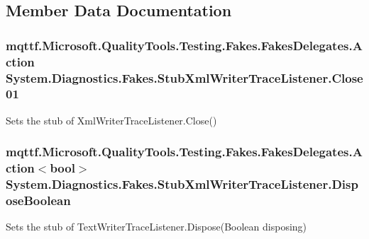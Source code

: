 \subsection{Member Data Documentation}
\hypertarget{class_system_1_1_diagnostics_1_1_fakes_1_1_stub_xml_writer_trace_listener_a513d9d1bfa7b2157c0c9e3e80cacd2f7}{
\subsubsection[{Close01}]{\setlength{\rightskip}{0pt plus 5cm}mqttf.\-Microsoft.\-Quality\-Tools.\-Testing.\-Fakes.\-Fakes\-Delegates.\-Action System.\-Diagnostics.\-Fakes.\-Stub\-Xml\-Writer\-Trace\-Listener.\-Close01}}\label{class_system_1_1_diagnostics_1_1_fakes_1_1_stub_xml_writer_trace_listener_a513d9d1bfa7b2157c0c9e3e80cacd2f7}


Sets the stub of Xml\-Writer\-Trace\-Listener.\-Close()

\hypertarget{class_system_1_1_diagnostics_1_1_fakes_1_1_stub_xml_writer_trace_listener_a7df633a59cdc8d496e40b0170d34ce55}{
\subsubsection[{Dispose\-Boolean}]{\setlength{\rightskip}{0pt plus 5cm}mqttf.\-Microsoft.\-Quality\-Tools.\-Testing.\-Fakes.\-Fakes\-Delegates.\-Action$<$bool$>$ System.\-Diagnostics.\-Fakes.\-Stub\-Xml\-Writer\-Trace\-Listener.\-Dispose\-Boolean}}\label{class_system_1_1_diagnostics_1_1_fakes_1_1_stub_xml_writer_trace_listener_a7df633a59cdc8d496e40b0170d34ce55}


Sets the stub of Text\-Writer\-Trace\-Listener.\-Dispose(\-Boolean disposing)

